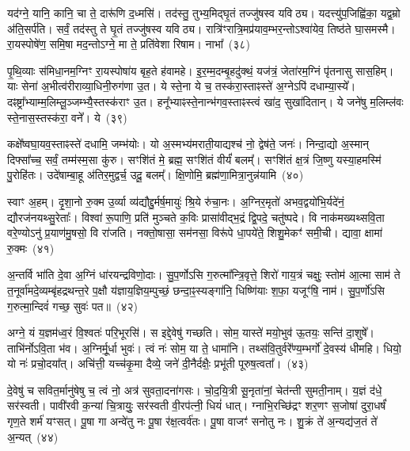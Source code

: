 यद॑ग्ने॒ यानि॒ कानि॒ चा ते॒ दारू॑णि द॒ध्मसि॑। तद॑स्तु॒ तुभ्य॒मिद्घृ॒तं तज्जु॑षस्व यविठ्य। यदत्त्यु॑प॒जिह्वि॑का॒ यद्व॒म्रो अ॑ति॒सर्प॑ति। सर्वं॒ तद॑स्तु ते घृ॒तं तज्जु॑षस्व यविठ्य। रात्रि॑ꣳरात्रि॒मप्र॑याव॒म्भर॒न्तो\-ऽश्वा॑येव॒ तिष्ठ॑ते घा॒समस्मै। रा॒यस्पोषे॑ण॒ समि॒षा मद॒न्तो\-ऽग्ने॒ मा ते॒ प्रति॑वेशा रिषाम। नाभा᳚~(३८)

पृ॒थि॒व्याः स॑मिधा॒नम॒ग्निꣳ रा॒यस्पोषा॑य बृह॒ते ह॑वामहे। इ॒र॒म्म॒दम्बृ॒हदु॑क्थं॒ यज॑त्रं॒ जेता॑रम॒ग्निं पृ॑तनासु सास॒हिम्। याः सेना॑ अ॒भीत्व॑रीराव्या॒धिनी॒रुग॑णा उ॒त। ये स्ते॒ना ये च॒ तस्क॑रा॒स्ताꣴस्ते॑ अ॒ग्ने\-ऽपि॑ दधाम्या॒स्ये᳚। दꣴष्ट्रा᳚भ्याम्म॒लिम्लू॒ञ्जम्भ्यै॒स्तस्क॑राꣳ उ॒त। हनू᳚भ्याꣴस्ते॒नान्भ॑गव॒स्ताꣴस्त्वं खा॑द॒ सुखा॑दितान्। ये जने॑षु म॒लिम्ल॑वः स्ते॒नास॒स्तस्क॑रा॒ वने᳚। ये~(३९)

कक्षे᳚ष्वघा॒यव॒स्ताꣴस्ते॑ दधामि॒ जम्भ॑योः। यो अ॒स्मभ्य॑मराती॒याद्यश्च॑ नो॒ द्वेष॑ते॒ जनः॑। निन्दा॒द्यो अ॒स्मान् दिफ्सा᳚च्च॒ सर्वं॒ तम्म॑स्म॒सा कु॑रु। सꣳशि॑तं मे॒ ब्रह्म॒ सꣳशि॑तं वीर्यं॑ बलम्᳚। सꣳशि॑तं क्ष॒त्रं जि॒ष्णु यस्या॒हमस्मि॑ पु॒रोहि॑तः। उदे॑षाम्बा॒हू अ॑तिर॒मुद्वर्च॒ उदू॒ बलम्᳚। क्षि॒णोमि॒ ब्रह्म॑णा॒मित्रा॒नुन्न॑यामि~(४०)

स्वाꣳ अ॒हम्। दृ॒शा॒नो रु॒क्म उ॒र्व्या व्य॑द्यौद्दु॒र्मर्\mbox{}ष॒मायुः॑ श्रि॒ये रु॑चा॒नः। अ॒ग्निर॒मृतो॑ अभव॒द्वयो॑भि॒र्यदे॑नं॒ द्यौरज॑नयथ्सु॒रेताः᳚। विश्वा॑ रू॒पाणि॒ प्रति॑ मुञ्चते क॒विः प्रासा॑वीद्भ॒द्रं द्वि॒पदे॒ चतु॑ष्पदे। वि नाक॑मख्यथ्सवि॒ता वरे॒ण्यो\-ऽनु॑ प्र॒याण॑मु॒षसो॒ वि रा॑जति। नक्तो॒षासा॒ सम॑नसा॒ विरू॑पे धा॒पये॑ते॒ शिशु॒मेकꣳ॑ समी॒ची। द्यावा॒ क्षामा॑ रु॒क्मः~(४१)

अ॒न्तर्वि भा॑ति दे॒वा अ॒ग्निं धा॑रयन्द्रविणो॒दाः। सु॒प॒र्णो\-ऽसि ग॒रुत्मा᳚न्त्रि॒वृत्ते॒ शिरो॑ गाय॒त्रं चक्षुः॒ स्तोम॑ आ॒त्मा साम॑ ते त॒नूर्वा॑मदे॒व्यम्बृ॑हद्रथन्त॒रे प॒क्षौ य॑ज्ञाय॒ज्ञिय॒म्पुच्छं॒ छन्दा॒ꣴ॒स्यङ्गा॑नि॒ धिष्णि॑याः श॒फा॒ यजूꣳ॑षि॒ नाम॑। सु॒प॒र्णो॑\-ऽसि ग॒रुत्मा॒न्दिवं॑ गच्छ॒ सुवः॑ पत॥~(४२)

{\anuvakamend[{नाभा॒ वने॒ येन॑ यामि॒ क्षामा॑ रु॒क्मो᳚\-ऽष्टात्रिꣳ॑शच्च}]}%

अग्ने॒ यं य॒ज्ञम॑ध्व॒रं वि॒श्वतः॑ परि॒भूरसि॑। स इद्दे॒वेषु॑ गच्छति। सोम॒ यास्ते॑ मयो॒भुव॑ ऊ॒तयः॒ सन्ति॑ दा॒शुषे᳚। ताभि॑र्नो\-ऽवि॒ता भ॑व। अ॒ग्निर्मू॒र्धा भुवः॑। त्वं नः॑ सोम॒ या ते॒ धामा॑नि। तथ्स॑वि॒तुर्वरे᳚ण्य॒म्भर्गो॑ दे॒वस्य॑ धीमहि। धियो॒ यो नः॑ प्रचो॒दया᳚त्। अचि॑त्ती॒ यच्च॑कृ॒मा दैव्ये॒ जने॑ दी॒नैर्दक्षैः॒ प्रभू॑ती पूरुष॒त्वता᳚।~(४३)

दे॒वेषु॑ च सवित॒र्मानु॑षेषु च॒ त्वं नो॒ अत्र॑ सुवता॒दना॑गसः। चो॒द॒यि॒त्री सू॒नृता॑नां॒ चेत॑न्ती सुमती॒नाम्। य॒ज्ञं द॑धे॒ सर॑स्वती। पावी॑रवी क॒न्या॑ चि॒त्रायुः॒ सर॑स्वती वी॒रप॑त्नी॒ धियं॑ धात्। ग्नाभि॒रच्छि॑द्रꣳ शर॒णꣳ स॒जोषा॑ दुरा॒धर्\mbox{}षं॑ गृण॒ते शर्म॑ यꣳसत्। पू॒षा गा अन्वे॑तु नः पू॒षा र॑क्ष॒त्वर्व॑तः। पू॒षा वाजꣳ॑ सनोतु नः। शु॒क्रं ते॑ अ॒न्यद्य॑ज॒तं ते॑ अ॒न्यत्~(४४)

